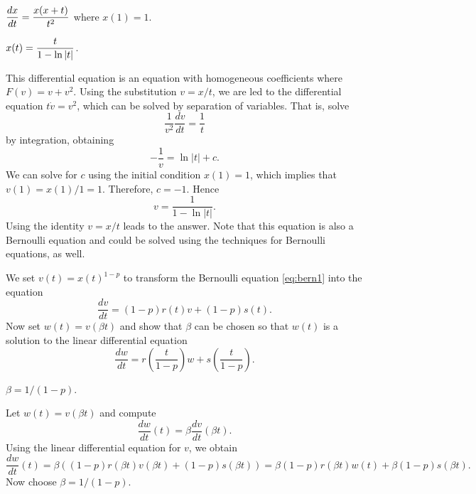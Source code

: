 \documentclass{ximera}
\begin{document}
\begin{exercise} \label{c14.5.9}
$\displaystyle \frac{dx}{dt} = \frac{x(x+t)}{t^2}$ where $x(1)=1$.

\begin{solution}
\ans $x(t) = \displaystyle\frac{t}{1-\ln|t|}$.

\soln  This differential equation is an equation with homogeneous
coefficients where $F(v) = v + v^2$.  Using the substitution $v=x/t$, we
are led to the differential equation $t\dot{v}=v^2$, which can be solved
by separation of variables.  That is, solve
\[
 \frac{1}{v^2} \frac{dv}{dt} = \frac{1}{t}
\]
by integration, obtaining
\[
-\frac{1}{v} = \ln|t| + c.
\]
We can solve for $c$ using the initial condition $x(1)=1$, which implies
that $v(1)=x(1)/1=1$.  Therefore, $c=-1$.  Hence
\[
v = \frac{1}{1-\ln|t|}.
\]
Using the identity $v=x/t$ leads to the answer.   Note that this equation is
also a Bernoulli equation and could be solved using the techniques for
Bernoulli equations, as well.

\end{solution}
\end{exercise}

\begin{exercise} \label{c14.5.10}
We set $v(t) = x(t)^{1-p}$ to transform the Bernoulli equation 
\eqref{eq:bern1} into the equation
\[
\frac{dv}{dt} = (1-p) r(t) v + (1-p) s(t).
\]
Now set $w(t) = v(\beta t)$ and show that $\beta$ can be chosen so that 
$w(t)$ is a solution to the linear differential equation
\[
\frac{dw}{dt} = r\left(\frac{t}{1-p}\right) w + s\left(\frac{t}{1-p}\right).
\]

\begin{solution}
\ans $\beta = 1/(1-p)$.

\soln Let $w(t) = v(\beta t)$ and compute
\[
\frac{dw}{dt}(t) = \beta \frac{dv}{dt}(\beta t).
\]
Using the linear differential equation for $v$, we obtain
\[
\frac{dw}{dt}(t) = \beta ((1-p) r(\beta t) v(\beta t) + (1-p) s(\beta t))
=  \beta (1-p) r(\beta t) w(t) + \beta (1-p) s(\beta t).
\]
Now choose $\beta = 1/(1-p)$.




\end{solution}
\end{exercise}
\end{document}
